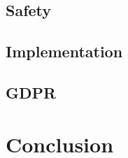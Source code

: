 \documentclass[conference]{IEEEtran}
\begin{document}
 \subsection{Safety}
 \subsection{Implementation}
 \subsection{GDPR}

\section{Conclusion}





\end{document}
